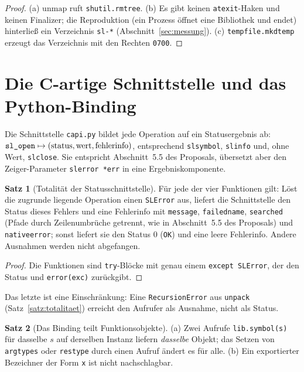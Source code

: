 \documentclass[a4paper,12pt,twoside]{report}
\DeclareRobustCommand{\_}{\ifmmode\mbox{\textunderscore}\else\textunderscore\allowbreak{}\fi}
\theoremstyle{definition}
\newtheorem{satz}{Satz}[chapter]
\begin{document}
\begin{proof}
	(a) $\mathrm{unmap}$ ruft \texttt{shutil.rmtree}. (b) Es gibt keinen \texttt{atexit}-Haken und keinen Finalizer; die Reproduktion (ein Prozess öffnet eine Bibliothek und endet) hinterließ ein Verzeichnis \texttt{sl-*} (Abschnitt~\ref{sec:messung}). (c) \texttt{tempfile.mkdtemp} erzeugt das Verzeichnis mit den Rechten \texttt{0700}.
\end{proof}

\section{Die C-artige Schnittstelle und das Python-Binding}

Die Schnittstelle \texttt{capi.py} bildet jede Operation auf ein Statusergebnis ab: $\texttt{sl\_open}\mapsto(\mathrm{status},\mathrm{wert},\mathrm{fehlerinfo})$, entsprechend \texttt{sl\_symbol}, \texttt{sl\_info} und, ohne Wert, \texttt{sl\_close}. Sie entspricht Abschnitt~5.5 des Proposals, übersetzt aber den Zeiger-Parameter \texttt{sl\_error *err} in eine Ergebniskomponente.

\begin{satz}[Totalität der Statusschnittstelle]
	\label{satz:capi}
	Für jede der vier Funktionen gilt: Löst die zugrunde liegende Operation einen \texttt{SLError} aus, liefert die Schnittstelle den Status dieses Fehlers und eine Fehlerinfo mit \texttt{message}, \texttt{failed\_name}, \texttt{searched} (Pfade durch Zeilenumbrüche getrennt, wie in Abschnitt~5.5 des Proposals) und \texttt{native\_error}; sonst liefert sie den Status $0$ (\texttt{OK}) und eine leere Fehlerinfo. Andere Ausnahmen werden nicht abgefangen.
\end{satz}

\begin{proof}
	Die Funktionen sind \texttt{try}-Blöcke mit genau einem \texttt{except SLError}, der den Status und \texttt{\_error(exc)} zurückgibt.
\end{proof}

Das letzte ist eine Einschränkung: Eine \texttt{RecursionError} aus \texttt{unpack} (Satz~\ref{satz:totalitaet}) erreicht den Aufrufer als Ausnahme, nicht als Status.

\begin{satz}[Das Binding teilt Funktionsobjekte]
	\label{satz:binding}
	(a) Zwei Aufrufe \texttt{lib.symbol(s)} für dasselbe $s$ auf derselben Instanz liefern \emph{dasselbe} Objekt; das Setzen von \texttt{argtypes} oder \texttt{restype} durch einen Aufruf ändert es für alle. (b) Ein exportierter Bezeichner der Form \texttt{\_\_x\_\_} ist nicht nachschlagbar.
\end{satz}
\end{document}
